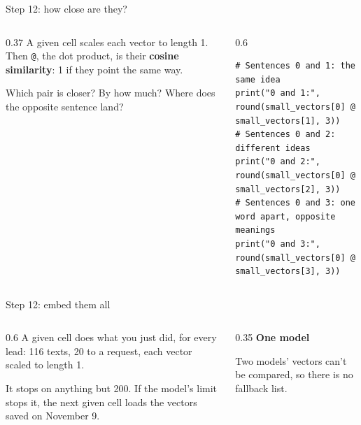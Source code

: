 \documentclass[9pt,aspectratio=169]{beamer}
\begin{document}
\begin{frame}[fragile]{Step 12: how close are they?}
    \begin{columns}[T]
        \begin{column}{0.37\textwidth}
            A given cell scales each vector to length 1. Then \texttt{@}, the dot product, is their \textbf{cosine similarity}: 1 if they point the same way.

            \medskip
            Which pair is closer? By how much? Where does the opposite sentence land?
        \end{column}
        \begin{column}{0.6\textwidth}
\begin{lstlisting}
# Sentences 0 and 1: the same idea
print("0 and 1:", round(small_vectors[0] @ small_vectors[1], 3))
# Sentences 0 and 2: different ideas
print("0 and 2:", round(small_vectors[0] @ small_vectors[2], 3))
# Sentences 0 and 3: one word apart, opposite meanings
print("0 and 3:", round(small_vectors[0] @ small_vectors[3], 3))
\end{lstlisting}
        \end{column}
    \end{columns}
\end{frame}

\begin{frame}{Step 12: embed them all}
    \begin{columns}[T]
        \begin{column}{0.6\textwidth}
            A given cell does what you just did, for every lead: 116 texts, 20 to a request, each vector scaled to length 1.

            \medskip
            It stops on anything but 200. If the model's limit stops it, the next given cell loads the vectors saved on November 9.
        \end{column}
        \begin{column}{0.35\textwidth}
            \textbf{One model}\\[2pt]
            {\footnotesize Two models' vectors can't be compared, so there is no fallback list.\par}
        \end{column}
    \end{columns}
\end{frame}
\end{document}
